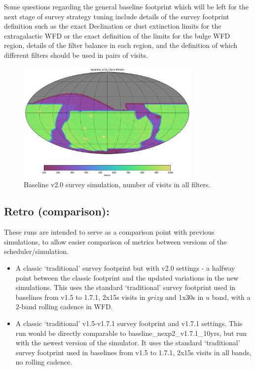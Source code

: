 Some questions regarding the general baseline footprint which will be left for the next stage of survey strategy tuning include details of the survey footprint definition such as the exact Declination or dust extinction limits for the extragalactic WFD or the exact definition of the limits for the bulge WFD region, details of the filter balance in each region, and the definition of which different filters should be used in pairs of visits. 


\begin{figure}[htbp]
\begin{center}
\includegraphics[width=0.8\textwidth]{baseline_v2_0_10yrs_Nvisits_HEAL_SkyMap}
\caption{Baseline v2.0 survey simulation, number of visits in all filters.}
\label{fig:baseline_v2.0_footprint}
\end{center}
\end{figure}



\subsection{Retro (comparison):}
These runs are intended to serve as a comparison point with previous simulations, to allow easier comparison of metrics between versions of the scheduler/simulation.
\begin{itemize} 
\item A classic ‘traditional’ survey footprint but with v2.0 settings - a halfway point between the classic footprint and the updated variations in the new simulations. This uses the standard ‘traditional’ survey footprint used in baselines from v1.5 to 1.7.1, 2x15s visits in $grizy$ and 1x30s in $u$ band, with a 2-band rolling cadence in WFD.
\item A classic ‘traditional’ v1.5-v1.7.1 survey footprint and v1.7.1 settings. This run would be directly comparable to baseline\_nexp2\_v1.7.1\_10yrs, but run with the newest version of the simulator. It uses the standard ‘traditional’ survey footprint used in baselines from v1.5 to 1.7.1, 2x15s visits in all bands, no rolling cadence.
\end{itemize}

